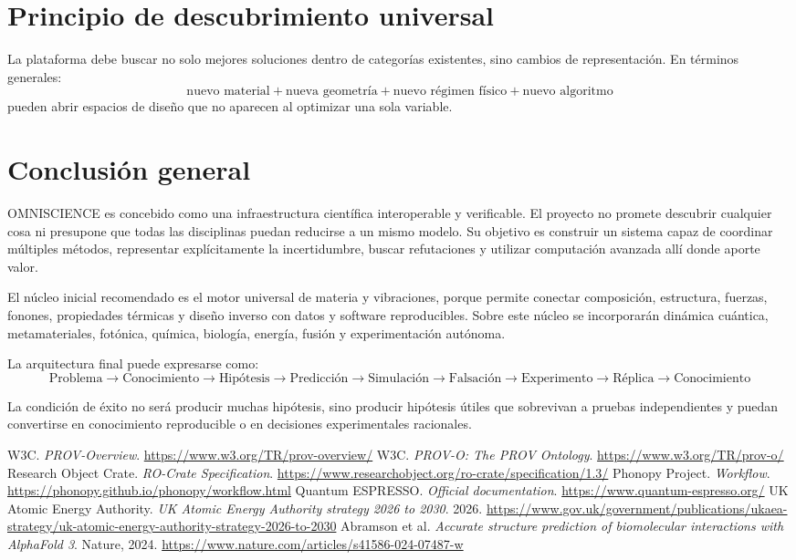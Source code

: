 \documentclass[11pt,a4paper]{article}
\begin{document}
\section{Principio de descubrimiento universal}
La plataforma debe buscar no solo mejores soluciones dentro de categorías existentes, sino cambios de representación. En términos generales:
\[
\text{nuevo material} + \text{nueva geometría} + \text{nuevo régimen físico} + \text{nuevo algoritmo}
\]
pueden abrir espacios de diseño que no aparecen al optimizar una sola variable.

\section{Conclusión general}
OMNISCIENCE es concebido como una infraestructura científica interoperable y verificable. El proyecto no promete descubrir cualquier cosa ni presupone que todas las disciplinas puedan reducirse a un mismo modelo. Su objetivo es construir un sistema capaz de coordinar múltiples métodos, representar explícitamente la incertidumbre, buscar refutaciones y utilizar computación avanzada allí donde aporte valor.

El núcleo inicial recomendado es el motor universal de materia y vibraciones, porque permite conectar composición, estructura, fuerzas, fonones, propiedades térmicas y diseño inverso con datos y software reproducibles. Sobre este núcleo se incorporarán dinámica cuántica, metamateriales, fotónica, química, biología, energía, fusión y experimentación autónoma.

La arquitectura final puede expresarse como:
\[
\boxed{
\text{Problema}\rightarrow\text{Conocimiento}\rightarrow\text{Hipótesis}\rightarrow\text{Predicción}\rightarrow\text{Simulación}\rightarrow\text{Falsación}\rightarrow\text{Experimento}\rightarrow\text{Réplica}\rightarrow\text{Conocimiento}
}
\]

La condición de éxito no será producir muchas hipótesis, sino producir hipótesis útiles que sobrevivan a pruebas independientes y puedan convertirse en conocimiento reproducible o en decisiones experimentales racionales.

\newpage
\begin{thebibliography}{99}
 W3C. \emph{PROV-Overview}. \url{https://www.w3.org/TR/prov-overview/}
 W3C. \emph{PROV-O: The PROV Ontology}. \url{https://www.w3.org/TR/prov-o/}
 Research Object Crate. \emph{RO-Crate Specification}. \url{https://www.researchobject.org/ro-crate/specification/1.3/}
 Phonopy Project. \emph{Workflow}. \url{https://phonopy.github.io/phonopy/workflow.html}
 Quantum ESPRESSO. \emph{Official documentation}. \url{https://www.quantum-espresso.org/}
 UK Atomic Energy Authority. \emph{UK Atomic Energy Authority strategy 2026 to 2030}. 2026. \url{https://www.gov.uk/government/publications/ukaea-strategy/uk-atomic-energy-authority-strategy-2026-to-2030}
 Abramson et al. \emph{Accurate structure prediction of biomolecular interactions with AlphaFold 3}. Nature, 2024. \url{https://www.nature.com/articles/s41586-024-07487-w}
\end{thebibliography}
\end{document}
